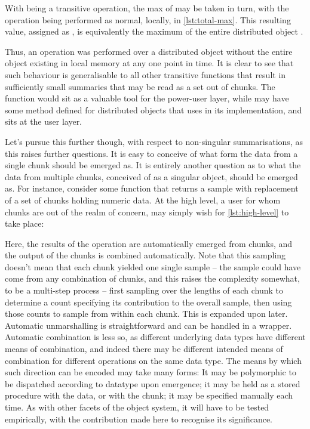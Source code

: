 
With  being a transitive operation, the max of  may be taken in turn, with the operation being performed as normal, locally, in \cref{lst:total-max}.
This resulting value, assigned as , is equivalently the maximum of the entire distributed object .


Thus, an operation was performed over a distributed object without the entire object existing in local memory at any one point in time.
It is clear to see that such behaviour is generalisable to all other transitive functions that result in sufficiently small summaries that may be read as a set out of chunks.
The  function would sit as a valuable tool for the power-user layer, while  may have some method defined for distributed objects that uses  in its implementation, and sits at the user layer.

Let's pursue this further though, with respect to non-singular summarisations, as this raises further questions.
It is easy to conceive of what form the data from a single chunk should be emerged as.
It is entirely another question as to what the data from multiple chunks, conceived of as a singular object, should be emerged as.
For instance, consider some function that returns a sample with replacement of a set of chunks holding numeric data.
At the high level, a user for whom chunks are out of the realm of concern, may simply wish for \cref{lst:high-level} to take place:


Here, the results of the operation are automatically emerged from chunks, and the output of the chunks is combined automatically.
Note that this sampling doesn't mean that each chunk yielded one single sample -- the sample could have come from any combination of chunks, and this raises the complexity somewhat, to be a multi-step process -- first sampling over the lengths of each chunk to determine a count specifying its contribution to the overall sample, then using those counts to sample from within each chunk.
This is expanded upon later.
Automatic unmarshalling is straightforward and can be handled in a wrapper.
Automatic combination is less so, as different underlying data types have different means of combination, and indeed there may be different intended means of combination for different operations on the same data type.
The means by which such direction can be encoded may take many forms: It may be polymorphic to be dispatched according to datatype upon emergence; it may be held as a stored procedure with the data, or with the chunk; it may be specified manually each time.
As with other facets of the object system, it will have to be tested empirically, with the contribution made here to recognise its significance.


